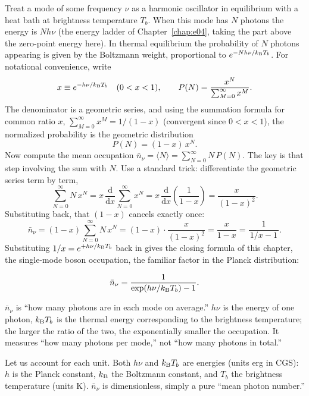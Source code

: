 Treat a mode of some frequency \(\nu\) as a harmonic oscillator in equilibrium with a heat bath at brightness temperature \(T_b\). When this mode has \(N\) photons the energy is \(N h\nu\) (the energy ladder of Chapter~\ref{chap:e04}, taking the part above the zero-point energy here). In thermal equilibrium the probability of \(N\) photons appearing is given by the Boltzmann weight, proportional to \(e^{-Nh\nu/k_{\rm B}T_b}\). For notational convenience, write
\[
  x\equiv e^{-h\nu/k_{\rm B}T_b}\quad(0<x<1),\qquad
  P(N)=\frac{x^N}{\sum_{M=0}^{\infty}x^M}.
\]
The denominator is a geometric series, and using the summation formula for common ratio \(x\), \(\sum_{M=0}^{\infty}x^M=1/(1-x)\) (convergent since \(0<x<1\)), the normalized probability is the geometric distribution
\[
  P(N)=(1-x)\,x^N .
\]
Now compute the mean occupation \(\bar n_\nu=\langle N\rangle=\sum_{N=0}^{\infty}N\,P(N)\). The key is that step involving the sum with \(N\). Use a standard trick: differentiate the geometric series term by term,
\[
  \sum_{N=0}^{\infty}N\,x^N
  =x\,\frac{\mathrm d}{\mathrm dx}\sum_{N=0}^{\infty}x^N
  =x\,\frac{\mathrm d}{\mathrm dx}\!\left(\frac1{1-x}\right)
  =\frac{x}{(1-x)^2}.
\]
Substituting back, that \((1-x)\) cancels exactly once:
\[
  \bar n_\nu=(1-x)\sum_{N=0}^{\infty}N\,x^N
  =(1-x)\cdot\frac{x}{(1-x)^2}
  =\frac{x}{1-x}
  =\frac1{\,1/x-1\,}.
\]
Substituting \(1/x=e^{+h\nu/k_{\rm B}T_b}\) back in gives the closing formula of this chapter, the single-mode boson occupation, the familiar factor in the Planck distribution:

\begin{equation}
  \bar n_\nu=\frac1{\exp(h\nu/k_{\rm B}T_b)-1}.
  \label{eq:e05-occupation}
\end{equation}
\begin{formulaexplain}
\(\bar n_\nu\) is ``how many photons are in each mode on average.'' \(h\nu\) is the energy of one photon, \(k_{\rm B}T_b\) is the thermal energy corresponding to the brightness temperature; the larger the ratio of the two, the exponentially smaller the occupation. It measures ``how many photons per mode,'' not ``how many photons in total.''
\end{formulaexplain}

Let us account for each unit. Both \(h\nu\) and \(k_{\rm B}T_b\) are energies (units erg in CGS): \(h\) is the Planck constant, \(k_{\rm B}\) the Boltzmann constant, and \(T_b\) the brightness temperature (units K). \(\bar n_\nu\) is dimensionless, simply a pure ``mean photon number.''

